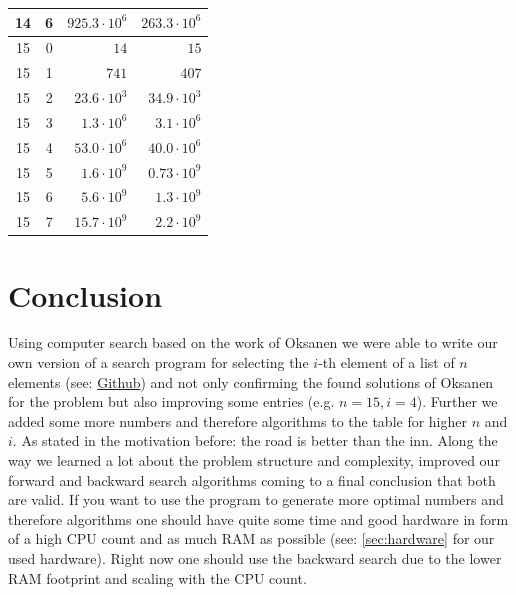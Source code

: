 \documentclass[10pt,journal,compsoc]{IEEEtran}
\begin{document}
\begin{table}[!t]
\begin{tabular}{c|c|r|r}
    14         & 6          & $925.3 \cdot 10^6$      & $263.3 \cdot 10^6$       \\
    \hline
    15         & 0          & $14$                    & $15$                     \\
    15         & 1          & $741$                   & $407$                    \\
    15         & 2          & $23.6 \cdot 10^3$       & $34.9 \cdot 10^3$        \\
    15         & 3          & $1.3 \cdot 10^6$        & $3.1 \cdot 10^6$         \\
    15         & 4          & $53.0 \cdot 10^6$       & $40.0 \cdot 10^6$        \\
    15         & 5          & $1.6 \cdot 10^9$        & $0.73 \cdot 10^9$        \\
    15         & 6          & $5.6 \cdot 10^9$        & $1.3 \cdot 10^9$         \\
    15         & 7          & $15.7 \cdot 10^9$       & $2.2 \cdot 10^9$         \\
  \end{tabular}
\end{table}


\section{Conclusion}

Using computer search based on the work of Oksanen we were able to write our own
version of a search program for selecting the $i$-th element of a list of $n$
elements (see: \href{https://github.com/JGDoerrer/selection_generator}{Github})
and not only confirming the found solutions of Oksanen for the problem but also
improving some entries (e.g. $n = 15, i = 4$). Further we added some more
numbers and therefore algorithms to the table for higher $n$ and $i$. As stated
in the motivation before: the road is better than the inn. Along the way we
learned a lot about the problem structure and complexity, improved our forward
and backward search algorithms coming to a final conclusion that both are valid.
If you want to use the program to generate more optimal numbers and therefore
algorithms one should have quite some time and good hardware in form of a high
CPU count and as much RAM as possible (see: \ref{sec:hardware} for our used
hardware).
Right now one should use the backward search due to the lower RAM footprint and
scaling with the CPU count.
\end{document}
